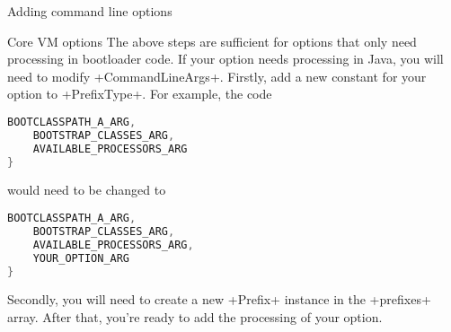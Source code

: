 \begin{section}{Adding command line options}
\begin{subsection}{Core VM options}
The above steps are sufficient for options that only need processing in bootloader code. If your option needs processing in Java, you will need to modify \spverb+CommandLineArgs+. Firstly, add a new constant for your option to \spverb+PrefixType+. For example, the code
\begin{lstlisting}[language=Java,title=CommandLineArgs.java]
    BOOTCLASSPATH_A_ARG,
    BOOTSTRAP_CLASSES_ARG,
    AVAILABLE_PROCESSORS_ARG
}
\end{lstlisting}

would need to be changed to

\begin{lstlisting}[language=Java,title=CommandLineArgs.java]
    BOOTCLASSPATH_A_ARG,
    BOOTSTRAP_CLASSES_ARG,
    AVAILABLE_PROCESSORS_ARG,
    YOUR_OPTION_ARG
}
\end{lstlisting}

Secondly, you will need to create a new \spverb+Prefix+ instance in the \spverb+prefixes+ array. After that, you're ready to add the processing of your option.

\end{subsection}

\end{section}